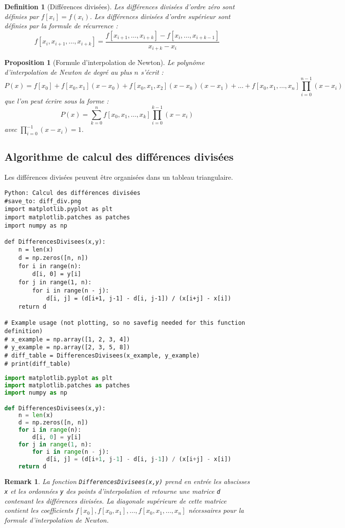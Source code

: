 \documentclass{article}
\newtheorem{proposition}[theorem]{Proposition}
\newtheorem{definition}{Definition}
\newtheorem{remark}{Remark}
\begin{document}
\begin{definition}[Différences divisées]
Les différences divisées d'ordre zéro sont définies par $f[x_i] = f(x_i)$. Les différences divisées d'ordre supérieur sont définies par la formule de récurrence :
\[
f[x_i, x_{i+1}, \dots, x_{i+k}] = \frac{f[x_{i+1}, \dots, x_{i+k}] - f[x_i, \dots, x_{i+k-1}]}{x_{i+k} - x_i}
\]
\end{definition}

\begin{proposition}[Formule d'interpolation de Newton]
Le polynôme d'interpolation de Newton de degré au plus $n$ s'écrit :
\[
P(x) = f[x_0] + f[x_0, x_1](x - x_0) + f[x_0, x_1, x_2](x - x_0)(x - x_1) + \dots + f[x_0, x_1, \dots, x_n] \prod_{i=0}^{n-1} (x - x_i)
\]
que l'on peut écrire sous la forme :
\[
P(x) = \sum_{k=0}^{n} f[x_0, x_1, \dots, x_k] \prod_{i=0}^{k-1} (x - x_i)
\]
avec $\prod_{i=0}^{-1} (x - x_i) = 1$.
\end{proposition}

\subsection{Algorithme de calcul des différences divisées}

Les différences divisées peuvent être organisées dans un tableau triangulaire.

\begin{verbatim}
Python: Calcul des différences divisées
#save_to: diff_div.png
import matplotlib.pyplot as plt
import matplotlib.patches as patches
import numpy as np

def DifferencesDivisees(x,y):
    n = len(x)
    d = np.zeros([n, n])
    for i in range(n):
        d[i, 0] = y[i]
    for j in range(1, n):
        for i in range(n - j):
            d[i, j] = (d[i+1, j-1] - d[i, j-1]) / (x[i+j] - x[i])
    return d

# Example usage (not plotting, so no savefig needed for this function definition)
# x_example = np.array([1, 2, 3, 4])
# y_example = np.array([2, 3, 5, 8])
# diff_table = DifferencesDivisees(x_example, y_example)
# print(diff_table)

\end{verbatim}
\begin{lstlisting}[language=Python, caption=Calcul des différences divisées, label=code:diff_div_python]
import matplotlib.pyplot as plt
import matplotlib.patches as patches
import numpy as np

def DifferencesDivisees(x,y):
    n = len(x)
    d = np.zeros([n, n])
    for i in range(n):
        d[i, 0] = y[i]
    for j in range(1, n):
        for i in range(n - j):
            d[i, j] = (d[i+1, j-1] - d[i, j-1]) / (x[i+j] - x[i])
    return d
\end{lstlisting}
\begin{remark}
La fonction \texttt{DifferencesDivisees(x,y)} prend en entrée les abscisses \texttt{x} et les ordonnées \texttt{y} des points d'interpolation et retourne une matrice \texttt{d} contenant les différences divisées. La diagonale supérieure de cette matrice contient les coefficients $f[x_0], f[x_0, x_1], \dots, f[x_0, x_1, \dots, x_n]$ nécessaires pour la formule d'interpolation de Newton.
\end{remark}
\end{document}
